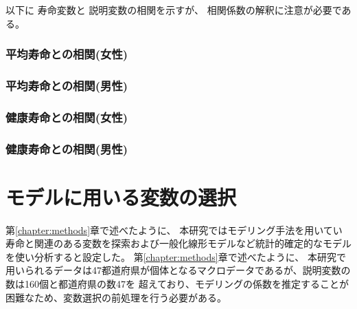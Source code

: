 \documentclass[a4j,11pt,mc]{jreport}
\begin{document}
以下に
寿命変数と
説明変数の相関を示すが、
相関係数の解釈に注意が必要である。

\subsection{平均寿命との相関(女性)}




\subsection{平均寿命との相関(男性)}




\subsection{健康寿命との相関(女性)}




\subsection{健康寿命との相関(男性)}
















%

%



\chapter{モデルに用いる変数の選択}\label{chapter:VarSelection}

第\ref{chapter:methods}章で述べたように、
本研究ではモデリング手法を用いてい
寿命と関連のある変数を探索および一般化線形モデルなど統計的確定的なモデルを使い分析すると設定した。
第\ref{chapter:methods}章で述べたように、
本研究で用いられるデータは47都道府県が個体となるマクロデータであるが、説明変数の数は160個と都道府県の数47を
超えており、モデリングの係数を推定することが困難なため、変数選択の前処理を行う必要がある。
\end{document}
